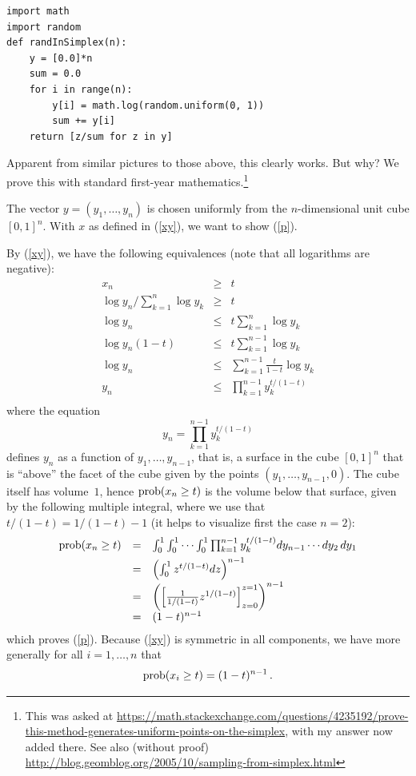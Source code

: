 \documentclass[a4paper,12pt]{article}  %
\theoremstyle{definition}
\def\prob{\hbox{prob}}
\newcommand{\0}{{\mathbf0}}
\newcommand{\1}{{\mathbf1}}
\begin{document}
{\small
\begin{verbatim}
import math 
import random
def randInSimplex(n):
    y = [0.0]*n
    sum = 0.0
    for i in range(n):
        y[i] = math.log(random.uniform(0, 1))
        sum += y[i]
    return [z/sum for z in y] 
\end{verbatim}}

Apparent from similar pictures to those above, this clearly works.
But why?
We prove this with standard first-year mathematics.\footnote{%
This was asked at
\url{https://math.stackexchange.com/questions/4235192/prove-this-method-generates-uniform-points-on-the-simplex}, with my answer now added there.
See also (without proof)
\url{http://blog.geomblog.org/2005/10/sampling-from-simplex.html}} 

The vector $y=(y_1,\ldots,y_n)$ is chosen uniformly from the
$n$-dimensional unit cube $[0,1]^n$. 
With $x$ as defined in (\ref{xy}), we want to show
(\ref{p}).

By (\ref{xy}), we have the following equivalences
(note that all logarithms are negative):
\renewcommand{\arraystretch}{1.5}
\[
\begin{array}{rcl}
x_n&\ge& t\\
\log y_n/\sum_{k=1}^n \log y_k&\ge& t\\
\log y_n&\le& t\sum_{k=1}^n \log y_k\\
\log y_n(1-t)&\le& t\sum_{k=1}^{n-1} \log y_k\\
\log y_n&\le&\sum_{k=1}^{n-1} \frac t{1-t} \log y_k\\
y_n&\le& \prod_{k=1}^{n-1} y_k^{t/(1-t)}\\
\end{array}
\]
where the equation 
\[
y_n=\prod_{k=1}^{n-1} y_k^{t/(1-t)}
\]
defines $y_n$ as a function of $y_1,\ldots,y_{n-1}$,
that is, a surface in the cube $[0,1]^n$  that is ``above'' the facet
of the cube given by the points $(y_1,\ldots,y_{n-1},0)$.
The cube itself has volume~$1$, hence $\prob(x_n\ge t)$ is
the volume below that surface, given by the following
multiple integral, where we use that $t/(1-t)=
1/(1-t)-1$ (it helps to visualize first the case $n=2$):
\[
\begin{array}{rcl}
\prob(x_n\ge t)&=&\int_0^1\int_0^1\cdots\int_0^1\prod_{k=1}^{n-1} y_k^{t/(1-t)}
dy_{n-1}\cdots dy_2\,dy_1
\\[1ex]
&=&\left(\int_0^1 z^{t/(1-t)}dz\right)^{n-1}\\[1ex]
&=&\left(\left[\frac 1{1/(1-t)}z^{1/(1-t)}\right]^{z=1}_{z=0}\right)^{n-1}\\
&=&(1-t)^{n-1}\\
\end{array}
\]
which proves (\ref{p}).
Because (\ref{xy}) is symmetric in all components, 
we have more generally for all $i=1,\ldots,n$ that
\[
\prob(x_i\ge t)=(1-t)^{n-1}\,.
\]
\end{document}
